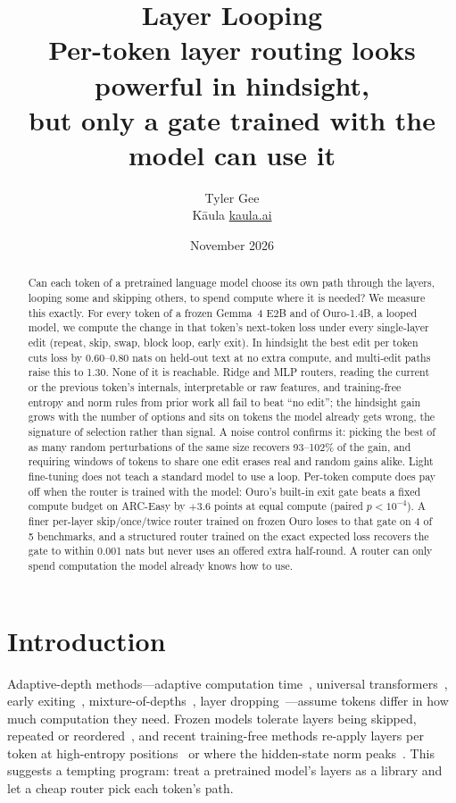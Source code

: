 \documentclass[11pt]{article}
\title{\textbf{Layer Looping}\\[4pt]
\large Per-token layer routing looks powerful in hindsight,\\ but only a gate trained with the model can use it}
\author{Tyler Gee\\ \small K\=aula \textperiodcentered{} \href{https://kaula.ai}{kaula.ai}}
\date{\small November 2026}
\begin{document}
\maketitle

\begin{abstract}
\noindent
Can each token of a pretrained language model choose its own path through the layers, looping some
and skipping others, to spend compute where it is needed? We measure this exactly. For every token of a
frozen Gemma~4 E2B and of Ouro-1.4B, a looped model, we compute the change in that token's next-token
loss under every single-layer edit (repeat, skip, swap, block loop, early exit). In hindsight the best edit
per token cuts loss by 0.60--0.80 nats on held-out text at no extra compute, and multi-edit paths raise this
to 1.30. None of it is reachable. Ridge and MLP routers, reading the current or the previous token's
internals, interpretable or raw features, and training-free entropy and norm rules from prior work all
fail to beat ``no edit''; the hindsight gain grows with the number of options and sits on tokens the model
already gets wrong, the signature of selection rather than signal. A noise control confirms it: picking
the best of as many random perturbations of the same size recovers 93--102\% of the gain, and requiring
windows of tokens to share one edit erases real and random gains alike. Light fine-tuning does not teach a
standard model to use a loop. Per-token compute does pay off when the router is trained with the model:
Ouro's built-in exit gate beats a fixed compute budget on ARC-Easy by $+3.6$ points at equal compute
(paired $p<10^{-4}$). A finer per-layer skip/once/twice router trained on frozen Ouro loses to that gate on
4 of 5 benchmarks, and a structured router trained on the exact expected loss recovers the gate to within
0.001 nats but never uses an offered extra half-round. A router can only spend computation the model
already knows how to use.
\end{abstract}

\section{Introduction}

Adaptive-depth methods---adaptive computation time~\citep{graves2016act}, universal
transformers~\citep{dehghani2019universal}, early exiting~\citep{schuster2022calm},
mixture-of-depths~\citep{raposo2024mod}, layer dropping~\citep{fan2020layerdrop,men2024shortgpt}---assume
tokens differ in how much computation they need. Frozen models tolerate layers being skipped, repeated or
reordered~\citep{sun2024painters,lad2024robustness}, and recent training-free methods re-apply layers per
token at high-entropy positions~\citep{bhattacharjee2026eglr} or where the hidden-state norm
peaks~\citep{zhang2026telltale}. This suggests a tempting program: treat a pretrained model's layers as a
library and let a cheap router pick each token's path.
\end{document}
